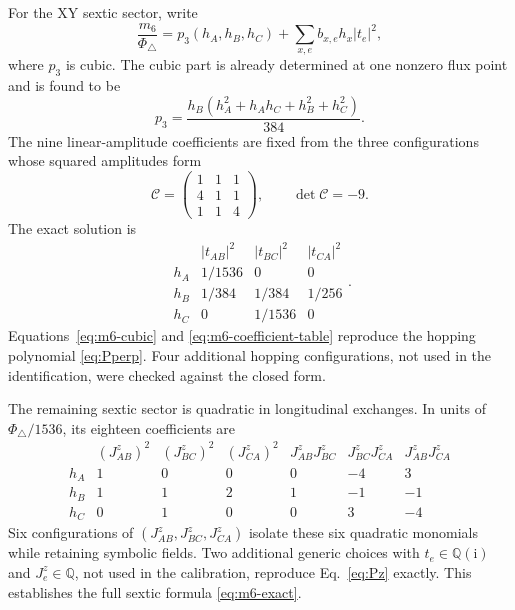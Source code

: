 \documentclass[aps,prb,preprint,nofootinbib,longbibliography]{revtex4-2}
\newcommand{\ii}{\mathrm{i}}
\newcommand{\PhiTri}{\Phi_\triangle}
\begin{document}
For the XY sextic sector, write
\begin{equation}
 \frac{m_6}{\PhiTri}=p_3(h_A,h_B,h_C)
 +\sum_{x,e}b_{x,e}h_x|t_e|^2,
 \label{eq:m6-ansatz}
\end{equation}
where $p_3$ is cubic.  The cubic part is already determined at one nonzero
flux point and is found to be
\begin{equation}
 p_3=\frac{h_B(h_A^2+h_Ah_C+h_B^2+h_C^2)}{384}.
 \label{eq:m6-cubic}
\end{equation}
The nine linear-amplitude coefficients are fixed from the three configurations
whose squared amplitudes form
\begin{equation}
 \mathcal C=
 \begin{pmatrix}
 1&1&1\\
 4&1&1\\
 1&1&4
 \end{pmatrix},
 \qquad \det\mathcal C=-9.
 \label{eq:calibration-matrix}
\end{equation}
The exact solution is
\begin{equation}
\begin{array}{c|ccc}
 &|t_{AB}|^2&|t_{BC}|^2&|t_{CA}|^2\\
\hline
h_A&1/1536&0&0\\
h_B&1/384&1/384&1/256\\
h_C&0&1/1536&0
\end{array}.
\label{eq:m6-coefficient-table}
\end{equation}
Equations~\eqref{eq:m6-cubic} and \eqref{eq:m6-coefficient-table} reproduce
the hopping polynomial \eqref{eq:Pperp}.  Four additional hopping
configurations, not used in the identification, were checked against the
closed form.

The remaining sextic sector is quadratic in longitudinal exchanges.  In
units of $\PhiTri/1536$, its eighteen coefficients are
\begin{equation}
\begin{array}{c|rrr|rrr}
 &(J_{AB}^z)^2&(J_{BC}^z)^2&(J_{CA}^z)^2
 &J_{AB}^zJ_{BC}^z&J_{BC}^zJ_{CA}^z&J_{AB}^zJ_{CA}^z\\
\hline
h_A&1&0&0&0&-4&3\\
h_B&1&1&2&1&-1&-1\\
h_C&0&1&0&0&3&-4
\end{array}
\label{eq:m6-Jz-table}
\end{equation}
Six configurations of $(J_{AB}^z,J_{BC}^z,J_{CA}^z)$ isolate these six
quadratic monomials while retaining symbolic fields.  Two additional generic
choices with $t_e\in\mathbb Q(\ii)$ and $J_e^z\in\mathbb Q$, not used in the
calibration, reproduce Eq.~\eqref{eq:Pz} exactly.  This establishes the full
sextic formula \eqref{eq:m6-exact}.
\end{document}
